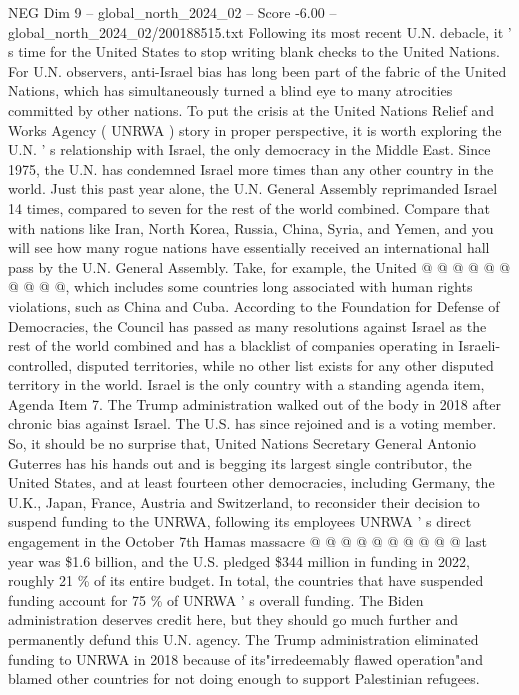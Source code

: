 \begin{textsample}{NEG Dim 9 – global\_north\_2024\_02 – Score -6.00 – global\_north\_2024\_02/200188515.txt}  \label{ex:f9_neg_282}
Following its most recent U.N. debacle, it ' s time for the United States to stop writing blank checks to the United Nations.
For U.N. observers, anti-Israel bias has long been part of the fabric of the United Nations, which has simultaneously turned a blind eye to many atrocities committed by other nations.
To put the crisis at the United Nations Relief and Works Agency ( UNRWA ) story in proper perspective, it is worth exploring the U.N. ' s relationship with Israel, the only democracy in the Middle East.
Since 1975, the U.N. has condemned Israel more times than any other country in the world.
Just this past year alone, the U.N.
General Assembly reprimanded Israel 14 times, compared to seven for the rest of the world combined.
Compare that with nations like Iran, North Korea, Russia, China, Syria, and Yemen, and you will see how many rogue nations have essentially received an international hall pass by the U.N.
General Assembly.
Take, for example, the United @ @ @ @ @ @ @ @ @ @, which includes some countries long associated with human rights violations, such as China and Cuba.
According to the Foundation for Defense of Democracies, the Council has passed as many resolutions against Israel as the rest of the world combined and has a blacklist of companies operating in Israeli-controlled, disputed territories, while no other list exists for any other disputed territory in the world.
Israel is the only country with a standing agenda item, Agenda Item 7.
The Trump administration walked out of the body in 2018 after chronic bias against Israel.
The U.S. has since rejoined and is a voting member.
So, it should be no surprise that, United Nations Secretary General Antonio Guterres has his hands out and is begging its largest single contributor, the United States, and at least fourteen other democracies, including Germany, the U.K., Japan, France, Austria and Switzerland, to reconsider their decision to suspend funding to the UNRWA, following its employees UNRWA ' s direct engagement in the October 7th Hamas massacre @ @ @ @ @ @ @ @ @ @ last year was \$1.6 billion, and the U.S. pledged \$344 million in funding in 2022, roughly 21 \% of its entire budget.
In total, the countries that have suspended funding account for 75 \% of UNRWA ' s overall funding.
The Biden administration deserves credit here, but they should go much further and permanently defund this U.N. agency.
The Trump administration eliminated funding to UNRWA in 2018 because of its"irredeemably flawed operation"and blamed other countries for not doing enough to support Palestinian refugees.

\end{textsample}
